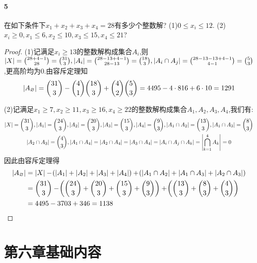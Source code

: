 \documentclass[11pt]{article}
\begin{document}
\paragraph{5}在如下条件下$x_1+x_2+x_3+x_4=28$有多少个整数解? (1)$0\leq x_i\leq 12$. (2)$x_i\geq 0, x_1\leq 6, x_2\leq 10, x_3\leq 15, x_4\leq 21$?
\begin{proof}
    (1)记满足$x_i\geq 13$的整数解构成集合$A_i$,则$\left|X\right|=\binom{28+4-1}{28}=\binom{31}{3},\left|A_i\right|=\binom{28-13+4-1}{28-13}=\binom{18}{3},\left|A_i\cap A_j\right|=\binom{28-13-13+4-1}{4-1}=\binom{5}{3}$,更高阶均为0.由容斥定理知
    $$\left|A_\varnothing\right|=\binom{31}{3}-\binom{4}{1}\binom{18}{3}+\binom{4}{2}\binom{5}{3}=4495-4\cdot 816+6\cdot 10=1291$$

    (2)记满足$x_1\geq 7, x_2\geq 11, x_3\geq 16, x_4\geq 22$的整数解构成集合$A_1, A_2, A_3, A_4$,我们有:
    $$\begin{gathered}
        \left|X\right|=\binom{31}{3}, \left|A_1\right|=\binom{24}{3}, \left|A_2\right|=\binom{20}{3}, \left|A_3\right|=\binom{15}{3}, \left|A_4\right|=\binom{9}{3}, \left|A_1\cap A_2\right|=\binom{13}{3},\left|A_1\cap A_3\right|=\binom{8}{3}\\
        \left|A_2\cap A_3\right|=\binom{4}{3}, \left|A_1\cap A_4\right|=\left|A_2\cap A_4\right|=\left|A_3\cap A_4\right|=\left|A_i\cap A_j\cap A_k\right|=\left|\bigcap_{k=1}^4 A_k\right|=0
    \end{gathered}$$
    因此由容斥定理得
    $$\begin{aligned}
        \left|A_{\varnothing}\right|&=\left|X\right|-\!\left(\left|A_1\right|+\left|A_2\right|+\left|A_3\right|+\left|A_4\right|\right)+\!\left(\left|A_1\cap A_2\right|+\left|A_1\cap A_3\right|+\left|A_2\cap A_3\right|\right)\\
        &=\binom{31}{3}-\!\left(\binom{24}{3}+\binom{20}{3}+\binom{15}{3}+\binom{9}{3}\right)+\!\left(\binom{13}{3}+\binom{8}{3}+\binom{4}{3}\right)\\
        &=4495-3703+346=1138
    \end{aligned}$$
\end{proof}

\section{第六章基础内容}
\end{document}
